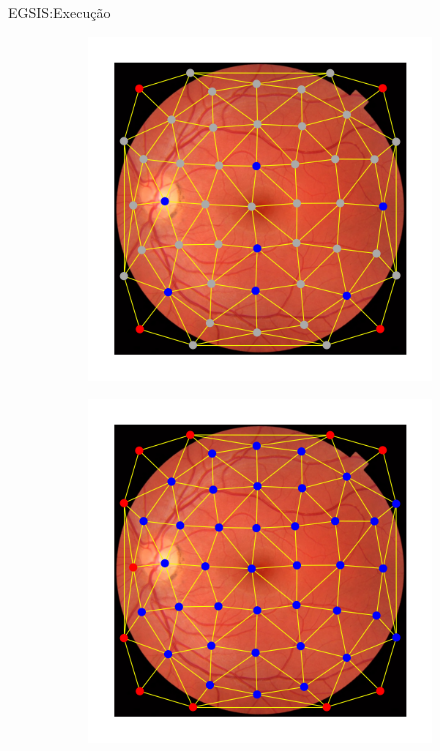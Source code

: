 \documentclass{templatebeamerufc/libs/ufc_format}
\begin{document}
\begin{frame}{EGSIS:\@ Execução}
\begin{figure}[!h]
  \centering
  \captionsetup{width=14cm}
  \caption{\label{fig:egsis-lcu}
    Etapa para propagar rótulos iniciais através da dinâmica coletiva LCU.\@
  }

  \begin{subfigure}[b]{0.45\textwidth}
    \centering
    \includegraphics[scale=0.47]{figuras/egsis-partial-labeled}
    \caption{\label{fig:egsis-partial-labeled}}
  \end{subfigure}
  \quad
  \begin{subfigure}[b]{0.45\textwidth}
    \centering
    \includegraphics[scale=0.47]{figuras/egsis-execution}
    \caption{\label{fig:egsis-execution}}
  \end{subfigure}
  \hfill{}
  \quad
\end{figure}
  \vspace{4cm}


\end{frame}
\end{document}
